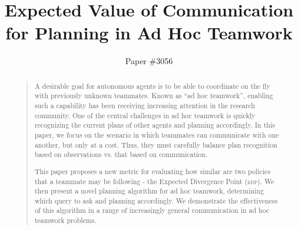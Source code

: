 \documentclass[letterpaper]{article}
\begin{document}
 \linenumbers 
%
\title{Expected Value of Communication \\ for Planning in Ad Hoc Teamwork}
\author{Paper \#3056}

\maketitle
\begin{abstract}
\begin{quote}
    A desirable goal for autonomous agents is to be able to coordinate on the fly with previously unknown teammates.  Known as “ad hoc teamwork”, enabling such a capability has been receiving increasing attention in the research community. One of the central challenges in ad hoc teamwork is quickly recognizing the current plans of other agents and planning accordingly.  In this paper, we focus on the scenario in which teammates can communicate with one another, but only at a cost.  Thus, they must carefully balance plan recognition based on observations vs. that based on communication.

    This paper proposes a new metric for evaluating how similar are two policies that a teammate may be following - the Expected Divergence Point (\textsc{edp}).
    We then present a novel planning algorithm for ad hoc teamwork, determining which query to ask and planning accordingly. We demonstrate the effectiveness of this algorithm in a range of increasingly general communication in ad hoc teamwork problems.


\end{quote}
\end{abstract}
\end{document}
